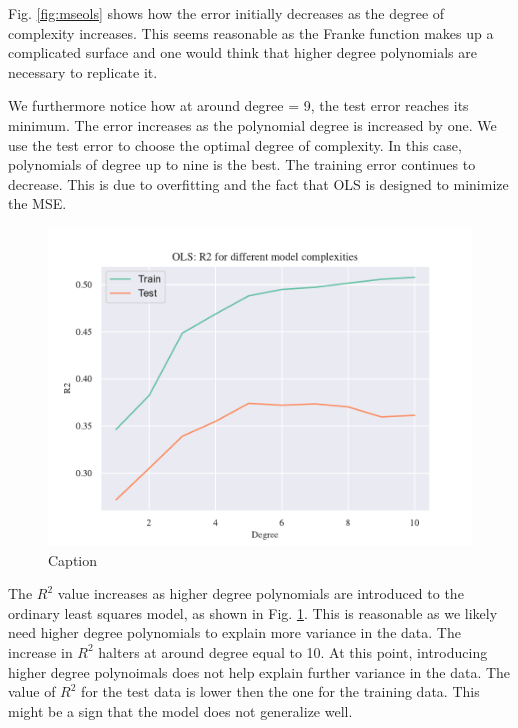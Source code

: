 Fig. \ref{fig:mseols} shows how the error initially decreases as the degree of complexity increases. This seems reasonable as the Franke function makes up a complicated surface and one would think that higher degree polynomials are necessary to replicate it. 

We furthermore notice how at around degree = 9, the test error reaches its minimum. The error increases as the polynomial degree is increased by one. We use the test error to choose the optimal degree of complexity. In this case, polynomials of degree up to nine is the best. The training error continues to decrease. This is due to overfitting and the fact that OLS is designed to minimize the MSE. 

\begin{figure}[h!]
    \centering
    \includegraphics[width=1\linewidth]{project_1_alt/figures/figures_in_report/OLS_R2_Franke_Noise.pdf}
    \caption{Caption}
    \label{fig:r2ols}
\end{figure}

The $R^2$ value increases as higher degree polynomials are introduced to the ordinary least squares model, as shown in Fig. \ref{fig:r2ols}. This is reasonable as we likely need higher degree polynomials to explain more variance in the data. The increase in $R^2$ halters at around degree equal to 10. At this point, introducing higher degree polynoimals does not help explain further variance in the data. The value of $R^2$ for the test data is lower then the one for the training data. This might be a sign that the model does not generalize well. 

